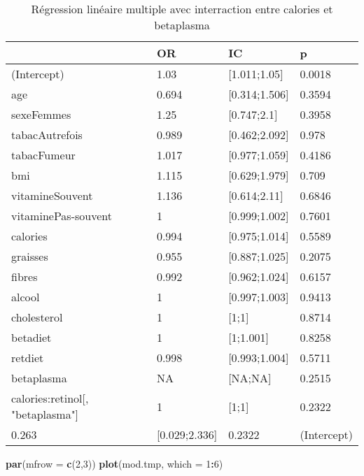 \documentclass[]{article}
\newenvironment{Shaded}{\begin{snugshade}}{\end{snugshade}}
\newcommand{\KeywordTok}[1]{\textcolor[rgb]{0.13,0.29,0.53}{\textbf{#1}}}
\newcommand{\DataTypeTok}[1]{\textcolor[rgb]{0.13,0.29,0.53}{#1}}
\newcommand{\DecValTok}[1]{\textcolor[rgb]{0.00,0.00,0.81}{#1}}
\newcommand{\OperatorTok}[1]{\textcolor[rgb]{0.81,0.36,0.00}{\textbf{#1}}}
\newcommand{\NormalTok}[1]{#1}
\begin{document}
\begin{table}

\caption{\label{tab:unnamed-chunk-88}Régression linéaire multiple avec interraction entre calories et betaplasma}
\centering
\begin{tabular}[t]{l|l|l|l}
\hline
  & OR & IC & p\\
\hline
\rowcolor[HTML]{BBD2E1}  (Intercept) & 1.03 & [1.011;1.05] & 0.0018\\
\hline
age & 0.694 & [0.314;1.506] & 0.3594\\
\hline
\rowcolor[HTML]{BBD2E1}  sexeFemmes & 1.25 & [0.747;2.1] & 0.3958\\
\hline
tabacAutrefois & 0.989 & [0.462;2.092] & 0.978\\
\hline
\rowcolor[HTML]{BBD2E1}  tabacFumeur & 1.017 & [0.977;1.059] & 0.4186\\
\hline
bmi & 1.115 & [0.629;1.979] & 0.709\\
\hline
\rowcolor[HTML]{BBD2E1}  vitamineSouvent & 1.136 & [0.614;2.11] & 0.6846\\
\hline
vitaminePas-souvent & 1 & [0.999;1.002] & 0.7601\\
\hline
\rowcolor[HTML]{BBD2E1}  calories & 0.994 & [0.975;1.014] & 0.5589\\
\hline
graisses & 0.955 & [0.887;1.025] & 0.2075\\
\hline
\rowcolor[HTML]{BBD2E1}  fibres & 0.992 & [0.962;1.024] & 0.6157\\
\hline
alcool & 1 & [0.997;1.003] & 0.9413\\
\hline
\rowcolor[HTML]{BBD2E1}  cholesterol & 1 & [1;1] & 0.8714\\
\hline
betadiet & 1 & [1;1.001] & 0.8258\\
\hline
\rowcolor[HTML]{BBD2E1}  retdiet & 0.998 & [0.993;1.004] & 0.5711\\
\hline
betaplasma & NA & [NA;NA] & 0.2515\\
\hline
\rowcolor[HTML]{BBD2E1}  calories:retinol[, "betaplasma"] & 1 & [1;1] & 0.2322\\
\hline
0.263 & [0.029;2.336] & 0.2322 & (Intercept)\\
\hline
\end{tabular}
\end{table}

\begin{Shaded}
\begin{Highlighting}[]
\KeywordTok{par}\NormalTok{(}\DataTypeTok{mfrow =} \KeywordTok{c}\NormalTok{(}\DecValTok{2}\NormalTok{,}\DecValTok{3}\NormalTok{))}
\KeywordTok{plot}\NormalTok{(mod.tmp, }\DataTypeTok{which =} \DecValTok{1}\OperatorTok{:}\DecValTok{6}\NormalTok{)}
\end{Highlighting}
\end{Shaded}
\end{document}
